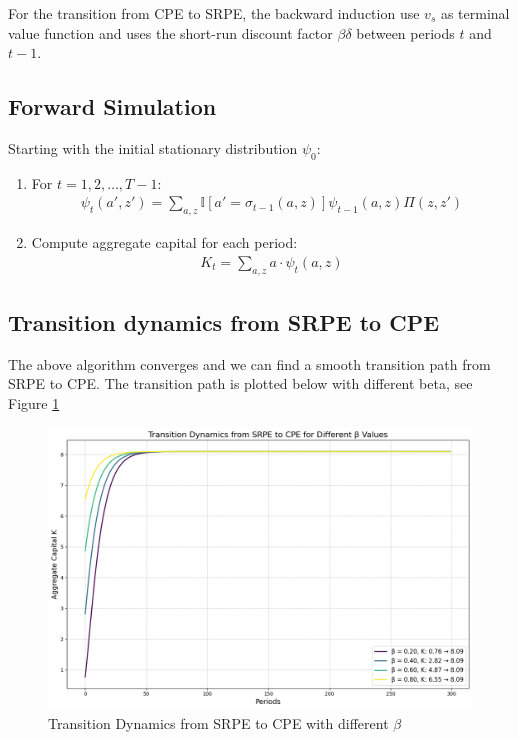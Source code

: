 \documentclass[11pt,a4paper]{article}
\begin{document}
\noindent For the transition from CPE to SRPE, the backward induction use $v_s$ as terminal value function and uses the short-run discount factor $\beta\delta$ between periods $t$ and $t-1$.

\subsection{Forward Simulation}

Starting with the initial stationary distribution $\psi_0$:
\begin{enumerate}
    \item For $t = 1, 2, \ldots, T-1$:
        \begin{align}
            \psi_t(a',z') = \sum_{a,z} \mathbb{I}[a' = \sigma_{t-1}(a,z)]\psi_{t-1}(a,z)\Pi(z,z')
        \end{align}
    \item Compute aggregate capital for each period:
        \begin{align}
            K_t = \sum_{a,z} a \cdot \psi_t(a,z)
        \end{align}
\end{enumerate}
\subsection{Transition dynamics from SRPE to CPE}
The above algorithm converges and we can find a smooth transition path from SRPE to CPE. The transition path is plotted below with different beta, see Figure \ref{fig: SRPE to CPE with different Beta}
\begin{figure}[h!]
    \centering
    \includegraphics[width=1\linewidth]{QHD/image/SRPE_to_CPE.png}
    \caption{Transition Dynamics from SRPE to CPE with different $\beta$}
    \label{fig: SRPE to CPE with different Beta}
\end{figure}
\end{document}
